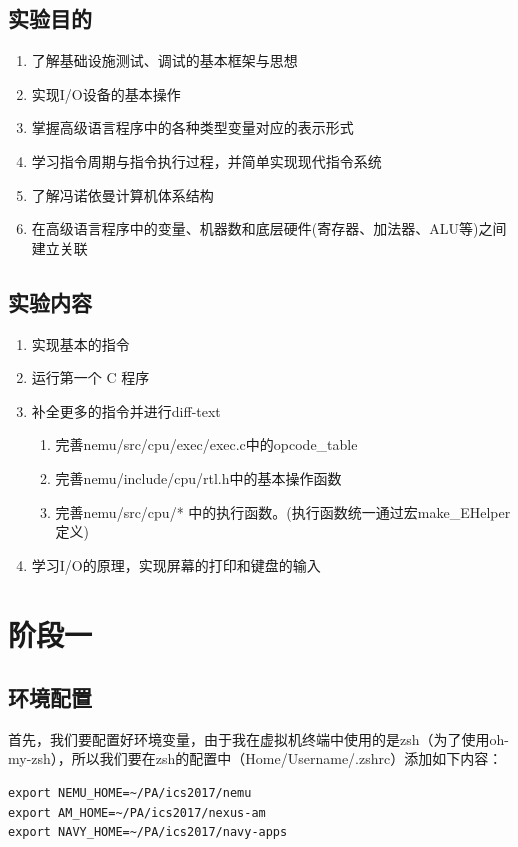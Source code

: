 \documentclass[UTF8,a4paper,10pt]{ctexart}
\begin{document}
\subsection{实验目的}
\begin{enumerate}
  \item 了解基础设施测试、调试的基本框架与思想
  \item 实现I/O设备的基本操作
  \item 掌握高级语言程序中的各种类型变量对应的表示形式
  \item 学习指令周期与指令执行过程，并简单实现现代指令系统
  \item 了解冯诺依曼计算机体系结构
  \item 在高级语言程序中的变量、机器数和底层硬件(寄存器、加法器、ALU等)之间建立关联
\end{enumerate}

\subsection{实验内容}
\begin{enumerate}
  \item 实现基本的指令
  \item 运行第一个 C 程序
  \item 补全更多的指令并进行diff-text
  \begin{enumerate}
    \item 完善nemu/src/cpu/exec/exec.c中的opcode\_table
    \item 完善nemu/include/cpu/rtl.h中的基本操作函数
    \item 完善nemu/src/cpu/* 中的执行函数。(执行函数统一通过宏make\_EHelper 定义)
  \end{enumerate}
  \item 学习I/O的原理，实现屏幕的打印和键盘的输入
\end{enumerate}

\section{阶段一}
\subsection{环境配置}
首先，我们要配置好环境变量，由于我在虚拟机终端中使用的是zsh（为了使用oh-my-zsh），所以我们要在zsh的配置中（Home/Username/.zshrc）添加如下内容：
\begin{lstlisting}[]
export NEMU_HOME=~/PA/ics2017/nemu
export AM_HOME=~/PA/ics2017/nexus-am
export NAVY_HOME=~/PA/ics2017/navy-apps
\end{lstlisting}
\end{document}
